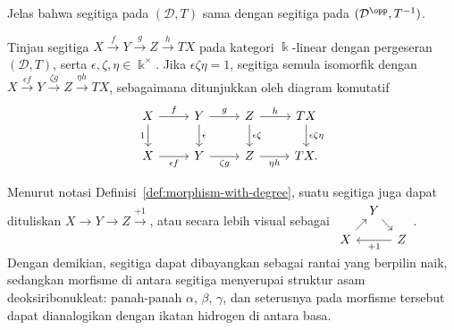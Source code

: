 Jelas bahwa segitiga pada $(\mathcal{D},T)$ sama dengan segitiga pada
$(\mathcal{D}^{\opp},T^{-1})$.

\begin{catatan}\label{rem:triangle-signs}
	Tinjau segitiga
	$X\xrightarrow{f}Y\xrightarrow{g}Z\xrightarrow{h}TX$ pada kategori
	$\Bbbk$-linear dengan pergeseran $(\mathcal{D},T)$, serta
	$\epsilon,\zeta,\eta\in\Bbbk^\times$. Jika
	$\epsilon\zeta\eta=1$, segitiga semula isomorfik dengan
	$X\xrightarrow{\epsilon f}Y\xrightarrow{\zeta g}Z
	\xrightarrow{\eta h}TX$, sebagaimana ditunjukkan oleh diagram komutatif
	\[\begin{tikzcd}
		X \arrow[r,"f"] \arrow[d,"1"'] &
		Y \arrow[r,"g"] \arrow[d,"\epsilon"] &
		Z \arrow[r,"h"] \arrow[d,"\epsilon\zeta"] &
		TX \arrow[d,"\epsilon\zeta\eta"] \\
		X \arrow[r,"\epsilon f"'] & Y \arrow[r,"\zeta g"'] &
		Z \arrow[r,"\eta h"'] & TX.
	\end{tikzcd}\]
\end{catatan}

Menurut notasi Definisi~\ref{def:morphism-with-degree}, suatu segitiga juga
dapat dituliskan $X\to Y\to Z\xrightarrow{+1}$, atau secara lebih visual
sebagai
$\begin{tikzcd}[row sep=small,column sep=tiny]
	& Y \arrow[rd] & \\
	X \arrow[ru] & & Z \arrow[ll,"{+1}"]
\end{tikzcd}$.
Dengan demikian, segitiga dapat dibayangkan sebagai rantai yang berpilin naik,
sedangkan morfisme di antara segitiga menyerupai struktur asam
deoksiribonukleat: panah-panah $\alpha$, $\beta$, $\gamma$, dan seterusnya pada
morfisme tersebut dapat dianalogikan dengan ikatan hidrogen di antara basa.


